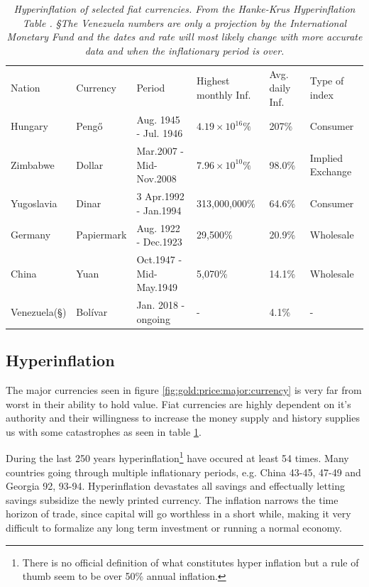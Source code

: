 \begin{table}[!htb]
	\begin{tabular}{llllll}
		Nation & Currency & Period & Highest monthly Inf. & Avg. daily Inf. & Type of index\\
		Hungary & Pengő & Aug. 1945 - Jul. 1946 & $ 4.19 × 10^{16}\% $ & 207\% & Consumer \\
		Zimbabwe & Dollar & Mar.2007 - Mid-Nov.2008 & $7.96 × 10^{10}\%$ & 98.0\% & Implied Exchange \\
		Yugoslavia & Dinar & 3 Apr.1992 - Jan.1994 & 313,000,000\% & 64.6\% & Consumer \\
		Germany & Papiermark & Aug. 1922 - Dec.1923 & 29,500\% & 20.9\% & Wholesale \\
		China & Yuan & Oct.1947 - Mid-May.1949 & 5,070\% & 14.1\% &	Wholesale \\
		Venezuela(§) & Bolívar & Jan. 2018 - ongoing & - & 4.1\% & - \\ 

	\end{tabular}
	\captionsetup{width=11cm}
	\caption{\textit{ Hyperinflation of selected fiat currencies. From the Hanke-Krus Hyperinflation Table \cite{hanke:krus:hyperinflation:table}. §The Venezuela numbers are only a projection by the International Monetary Fund
			and the dates and rate will most likely change with more accurate data\cite{hanke:hyperinflation} and when the inflationary period is over.
	}}
	\label{tab:inflation}
\end{table}

\subsection{Hyperinflation}

The major currencies seen in figure \ref{fig:gold:price:major:currency} is very far from worst in their ability to hold value. Fiat currencies are highly dependent on it's authority and their willingness to increase the money supply and history supplies us with some catastrophes as seen in table \ref{tab:inflation}.

During the last 250 years hyperinflation\footnote{There is no official definition of what constitutes hyper inflation but a rule of thumb seem to be over 50\% annual inflation.} have occured at least 54 times\cite{hanke:krus:hyperinflation:table}\cite{hanke:hyperinflation}. Many countries going through multiple inflationary periods, e.g. China 43-45, 47-49 and Georgia 92, 93-94. Hyperinflation devastates all savings and effectually letting savings subsidize the newly printed currency. The inflation narrows the time horizon of trade, since capital will go worthless in a short while, making it very difficult to formalize any long term investment or running a normal economy. 

